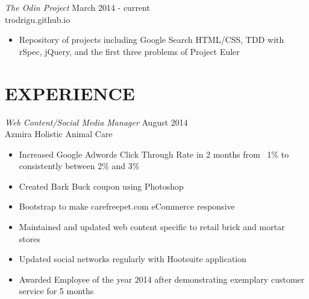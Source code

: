 \documentclass[margin]{res}
\begin{document}
\begin{resume}
  {\sl The Odin Project} \hfill March 2014 - current \\
  trodrigu.github.io
  \begin{itemize}
      \item Repository of projects including Google Search HTML/CSS, TDD with rSpec, jQuery, and the first three problems of Project Euler
  \end{itemize} 

\section{EXPERIENCE} 

  {\sl Web Content/Social Media Manager} \hfill August 2014 \\
  Azmira Holistic Animal Care
  \begin{itemize}
      \item Increased Google Adwords Click Through Rate in 2 months from ~1\% to consistently between 2\% and 3\%
      \item Created Bark Buck coupon using Photoshop
      \item Bootstrap to make carefreepet.com eCommerce responsive
      \item Maintained and updated web content specific to retail brick and mortar stores
      \item Updated social networks regularly with Hootsuite application
      \item Awarded Employee of the year 2014 after demonstrating exemplary customer service for 5 months
  \end{itemize}


\end{resume}
\end{document}
